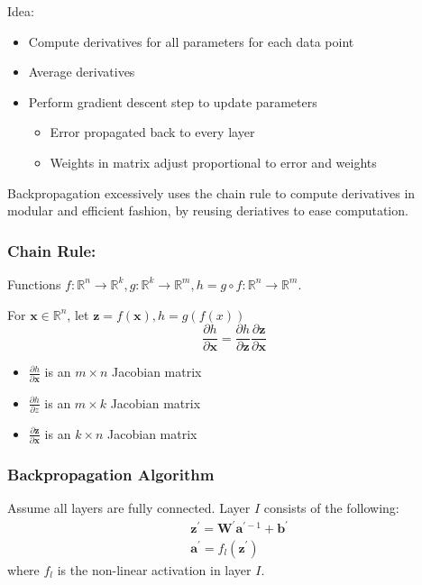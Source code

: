 \documentclass[11pt, %
	oneside, %
	english, %
	onehalfspacing, %
	parskip, %
	]{article} %
\theoremstyle{definition}
\begin{document}
Idea:
\begin{itemize}
	\item Compute derivatives for all parameters for each data point
	\item Average derivatives
	\item Perform gradient descent step to update parameters
	\begin{itemize}
		\item Error propagated back to every layer
		\item Weights in matrix adjust proportional to error and weights
	\end{itemize}
\end{itemize}

Backpropagation excessively uses the chain rule to compute derivatives in modular and efficient fashion, by reusing deriatives to ease computation.

\subsubsection*{Chain Rule:}

Functions $f: \mathbb{R}^n \rightarrow \mathbb{R}^k, g: \mathbb{R}^k \rightarrow \mathbb{R}^m, h=g \circ f: \mathbb{R}^n \rightarrow \mathbb{R}^m$.


For $\mathbf{x} \in \mathbb{R}^n$, let $\mathbf{z}=f(\mathbf{x}), h =g({f(x)})$
$$
\frac{\partial h}{\partial \mathbf{x}}=  \frac{\partial h}{\partial \mathbf{z}} \frac{\partial \mathbf{z}}{\partial \mathbf{x}}
$$
\begin{itemize}
	\item $\frac{\partial h}{\partial \mathbf{x}}$ is an $m \times n$ Jacobian matrix
	\item $\frac{\partial h}{\partial z}$ is an $m \times k$ Jacobian matrix
	\item $\frac{\partial \mathbf{z}}{\partial \mathbf{x}}$ is an $k \times n$ Jacobian matrix
\end{itemize}

\subsubsection*{Backpropagation Algorithm}

Assume all layers are fully connected. Layer $I$  consists of the following:
$$
\begin{aligned}
& \mathbf{z}^{\prime}=\mathbf{W}^{\prime} \mathbf{a}^{\prime-1}+\mathbf{b}^{\prime} \\
& \mathbf{a}^{\prime}=f_l\left(\mathbf{z}^{\prime}\right)
\end{aligned}
$$
where $f_l$ is the non-linear activation in layer $I$.
\end{document}
